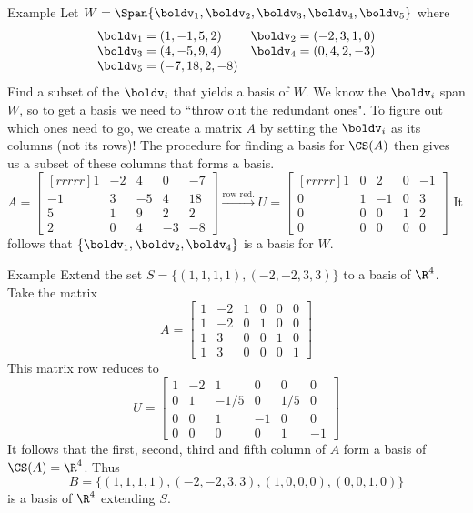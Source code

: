 \begin{frame}{Example}
\footnotesize
Let $W=\Span\{\boldv_1,\boldv_2, \boldv_3, \boldv_4, \boldv_5\}$ where 
\[
\begin{array}{ll}
\boldv_1=(1,-1,5,2)&\boldv_2=(-2,3,1,0)\\
\boldv_3=(4,-5,9,4)&\boldv_4=(0,4,2,-3)\\
\boldv_5=(-7,18,2,-8)
\end{array}
\]
Find a subset of the $\boldv_i$ that yields a basis of $W$. 
\bpause 
We know the $\boldv_i$ span $W$, so to get a basis we need to ``throw out the redundant ones". To figure out which ones need to go, we create a matrix $A$ by setting the $\boldv_i$ as  its \alert{columns} (not its rows)! The procedure for finding a basis for $\CS(A)$ then gives us a subset of these columns that forms a basis.
\bpause 
$A=\begin{bmatrix}[rrrrr]
1&-2&4&0&-7\\
-1&3&-5&4&18\\
5&1&9&2&2\\ 
2&0&4&-3&-8
\end{bmatrix}
\xrightarrow[]{\text{row red.}}
U=
\begin{bmatrix}[rrrrr]
\boxed{1}&0&2&0&-1\\
0&\boxed{1}&-1&0&3\\
0&0&0&\boxed{1}&2\\
0&0&0&0&0
\end{bmatrix}
$
\bpause
It follows that $\{\boldv_1,\boldv_2, \boldv_4\}$ is a basis for $W$. 
\end{frame}
\begin{frame}{Example}
Extend the set $S=\{ (1,1,1,1), (-2,-2,3,3)\}$ to a basis of $\R^4$. 
\bpause
Take the matrix 
\[
A=\begin{bmatrix}
1&-2&1&0&0&0\\
1&-2&0&1&0&0\\
1&3&0&0&1&0\\
1&3&0&0&0&1
\end{bmatrix}
\]
This matrix row reduces to 
\[
U=\begin{bmatrix}
\boxed{1}&-2&1&0&0&0\\
0&\boxed{1}&-1/5&0&1/5&0\\
0&0&\boxed{1}&-1&0&0\\
0&0&0&0&\boxed{1}&-1
\end{bmatrix}
\]
\pause
It follows that the first, second, third and fifth column of $A$ form a basis of $\CS(A)=\R^4$. Thus 
\[
B=\{(1,1,1,1), (-2,-2,3,3), (1,0,0,0), (0,0,1,0)\}
\]
is a basis of $\R^4$ extending $S$. 

\end{frame}
